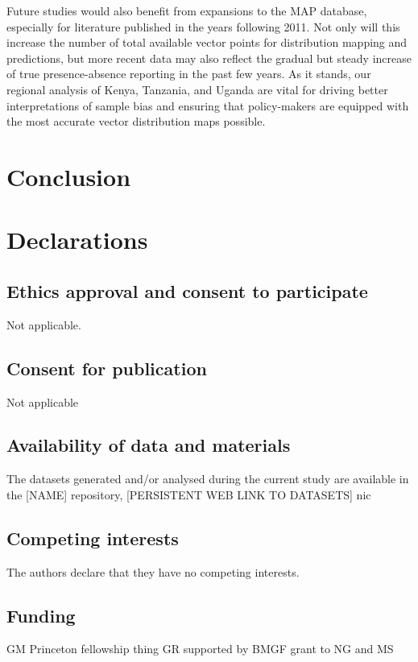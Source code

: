 \documentclass[sn-nature]{sn-jnl}%
\begin{document}
Future studies would also benefit from expansions to the MAP database, especially for literature published in the years following 2011. Not only will this increase the number of total available vector points for distribution mapping and predictions, but more recent data may also reflect the gradual but steady increase of true presence-absence reporting in the past few years. As it stands, our regional analysis of Kenya, Tanzania, and Uganda are vital for driving better interpretations of sample bias and ensuring that policy-makers are equipped with the most accurate vector distribution maps possible.



\section*{Conclusion}\label{conclusion}


\section*{Declarations}

\subsection*{Ethics approval and consent to participate}
Not applicable.

\subsection*{Consent for publication}
Not applicable

\subsection*{Availability of data and materials}
The datasets generated and/or analysed during the current study are available in the [NAME] repository, [PERSISTENT WEB LINK TO DATASETS]
nic
\subsection*{Competing interests}
The authors declare that they have no competing interests.

\subsection*{Funding}
GM Princeton fellowship thing
GR supported by BMGF grant to NG and MS
\end{document}
